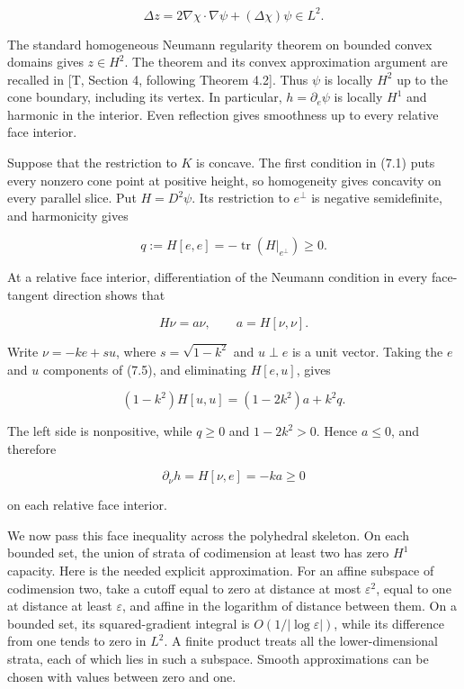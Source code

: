 \documentclass[11pt]{article}
\begin{document}
\[
\Delta z=2\nabla\chi\cdot\nabla\psi+(\Delta\chi)\psi\in L^2.
\tag{7.3}
\]

The standard homogeneous Neumann regularity theorem on bounded convex
domains gives \(z\in H^2\). The theorem and its convex approximation
argument are recalled in {[}T, Section 4, following Theorem 4.2{]}. Thus
\(\psi\) is locally \(H^2\) up to the cone boundary, including its
vertex. In particular, \(h=\partial_e\psi\) is locally \(H^1\) and
harmonic in the interior. Even reflection gives smoothness up to every
relative face interior.

Suppose that the restriction to \(K\) is concave. The first condition in
(7.1) puts every nonzero cone point at positive height, so homogeneity
gives concavity on every parallel slice. Put \(H=D^2\psi\). Its
restriction to \(e^\perp\) is negative semidefinite, and harmonicity
gives

\[
q:=H[e,e]=-\operatorname{tr}(H|_{e^\perp})\ge0.
\tag{7.4}
\]

At a relative face interior, differentiation of the Neumann condition in
every face-tangent direction shows that

\[
H\nu=a\nu,\qquad a=H[\nu,\nu].
\tag{7.5}
\]

Write \(\nu=-ke+su\), where \(s=\sqrt{1-k^2}\) and \(u\perp e\) is a
unit vector. Taking the \(e\) and \(u\) components of (7.5), and
eliminating \(H[e,u]\), gives

\[
(1-k^2)H[u,u]=(1-2k^2)a+k^2q.
\tag{7.6}
\]

The left side is nonpositive, while \(q\ge0\) and \(1-2k^2>0\). Hence
\(a\le0\), and therefore

\[
\partial_\nu h=H[\nu,e]=-ka\ge0
\tag{7.7}
\]

on each relative face interior.

We now pass this face inequality across the polyhedral skeleton. On each
bounded set, the union of strata of codimension at least two has zero
\(H^1\) capacity. Here is the needed explicit approximation. For an
affine subspace of codimension two, take a cutoff equal to zero at
distance at most \(\varepsilon^2\), equal to one at distance at least
\(\varepsilon\), and affine in the logarithm of distance between them.
On a bounded set, its squared-gradient integral is
\(O(1/|\log\varepsilon|)\), while its difference from one tends to zero
in \(L^2\). A finite product treats all the lower-dimensional strata,
each of which lies in such a subspace. Smooth approximations can be
chosen with values between zero and one.
\end{document}
